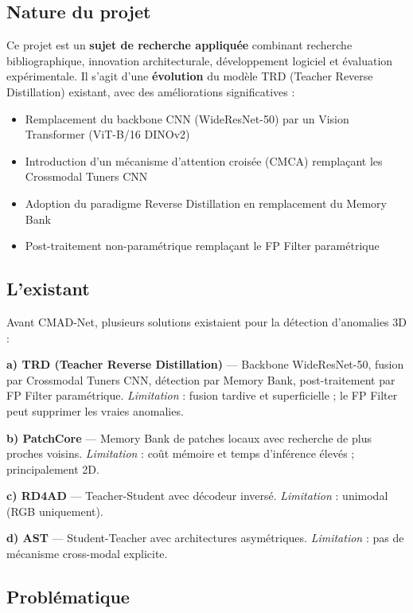 \documentclass[12pt,a4paper,oneside]{report}
\begin{document}
\subsection{Nature du projet}

Ce projet est un \textbf{sujet de recherche appliquée} combinant recherche bibliographique, innovation architecturale, développement logiciel et évaluation expérimentale. Il s'agit d'une \textbf{évolution} du modèle TRD (Teacher Reverse Distillation) existant, avec des améliorations significatives :

\begin{itemize}
    \item Remplacement du backbone CNN (WideResNet-50) par un Vision Transformer (ViT-B/16 DINOv2)
    \item Introduction d'un mécanisme d'attention croisée (CMCA) remplaçant les Crossmodal Tuners CNN
    \item Adoption du paradigme Reverse Distillation en remplacement du Memory Bank
    \item Post-traitement non-paramétrique remplaçant le FP Filter paramétrique
\end{itemize}

\subsection{L'existant}

Avant CMAD-Net, plusieurs solutions existaient pour la détection d'anomalies 3D :

\textbf{a) TRD (Teacher Reverse Distillation)} --- Backbone WideResNet-50, fusion par Crossmodal Tuners CNN, détection par Memory Bank, post-traitement par FP Filter paramétrique. \textit{Limitation} : fusion tardive et superficielle ; le FP Filter peut supprimer les vraies anomalies.

\textbf{b) PatchCore} --- Memory Bank de patches locaux avec recherche de plus proches voisins. \textit{Limitation} : coût mémoire et temps d'inférence élevés ; principalement 2D.

\textbf{c) RD4AD} --- Teacher-Student avec décodeur inversé. \textit{Limitation} : unimodal (RGB uniquement).

\textbf{d) AST} --- Student-Teacher avec architectures asymétriques. \textit{Limitation} : pas de mécanisme cross-modal explicite.

\subsection{Problématique}
\end{document}
